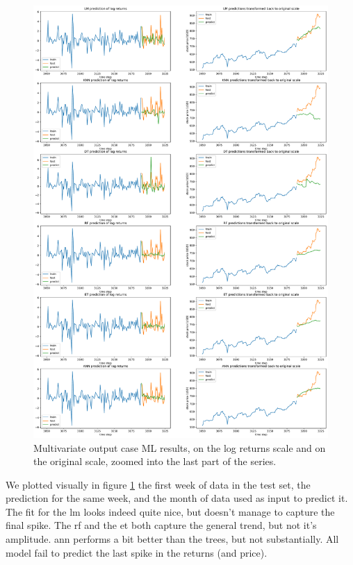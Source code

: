 \begin{figure}
	\centering
	\includegraphics[width=\textwidth]{img/img_mlresults_v2.pdf}
	\caption{Multivariate output case ML results, on the log returns scale and on the original scale, zoomed into the last part of the series.}
	\label{fig:mlresults_v2}
\end{figure}

We plotted visually in figure \ref{fig:mlresults_v2} the first week of data in the test set, the prediction for the same week, and the month of data used as input to predict it. The fit for the \acrshort{lm} looks indeed quite nice, but doesn't manage to capture the final spike.
The \acrlong{rf} and the \acrlong{et} both capture the general trend, but not it's amplitude. \acrshort{ann} performs a bit better than the trees, but not substantially. All model fail to predict the last spike in the returns (and price).